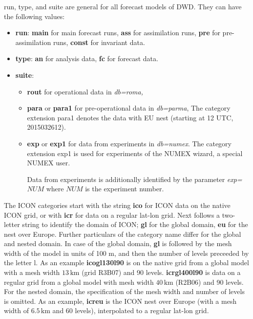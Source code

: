 run, type, and suite are general for all forecast models of DWD. They can have the 
following values:
\begin{itemize}
 \item \textbf{run}: \textbf{main} for main forecast runs,
                     \textbf{ass} for assimilation runs,
                     \textbf{pre} for pre-assimilation runs,
                     \textbf{const} for invariant data.
 \item \textbf{type}: \textbf{an} for analysis data,
                      \textbf{fc} for forecast data.
 \item \textbf{suite}: 
       \begin{itemize}
         \item \textbf{rout} for operational data in \emph{db=roma,}
         \item \textbf{para} or \textbf{para1} for pre-operational data in \emph{db=parma},
                       The category extension para1 denotes the data with EU nest
                       (starting at 12 UTC, 2015032612).
         \item \textbf{exp} or \textbf{exp1} for data from experiments in
                       \emph{db=numex}. The category extension exp1 is used for
                       experiments of the NUMEX wizard, a special NUMEX user.

                       Data from experiments is additionally
                       identified by the parameter \emph{exp=}$NUM$ where $NUM$ is
                       the experiment number.
       \end{itemize}
\end{itemize}

The ICON categories start with the string \textbf{ico} for ICON data on 
the native ICON grid, or with \textbf{icr} for data on a regular lat-lon grid.
Next follows a two-letter string to identify the domain of ICON; \textbf{gl} for the
global domain, \textbf{eu} for the nest over Europe. Further particulars of the category 
name differ for the global and nested domain. In case of the global domain, \textbf{gl} 
is followed by the mesh width of the model in units of 100 m, and then the number of levels 
preceeded by the letter l. As an example \textbf{icogl130l90} is on the native grid from a global 
model with a mesh width $13\,\mathrm{km}$ (grid R3B07) and 90 levels. \textbf{icrgl400l90} is data 
on a regular grid from a global model with mesh width $40\,\mathrm{km}$ (R2B06) and 90 levels. 
For the nested domain, the specification of the mesh width and number of levels is omitted. As an 
example, \textbf{icreu} is the ICON nest over Europe (with a mesh width of $6.5\,\mathrm{km}$ and 60 
levels), interpolated to a regular lat-lon grid.

